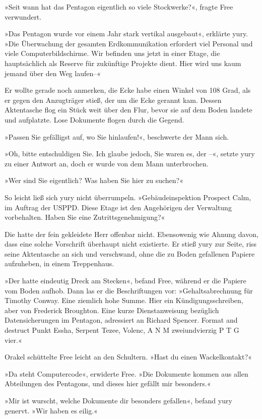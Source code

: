 »Seit wann hat das Pentagon eigentlich so viele Stockwerke?«, fragte Free verwundert.

»Das Pentagon wurde vor einem Jahr stark vertikal ausgebaut«, erklärte yury. »Die Überwachung der gesamten Erdkommunikation erfordert viel Personal und viele Computerbildschirme. Wir befinden uns jetzt in einer Etage, die hauptsächlich als Reserve für zukünftige Projekte dient. Hier wird uns kaum jemand über den Weg laufen–«

Er wollte gerade noch anmerken, die Ecke habe einen Winkel von 108 Grad, als er gegen den Anzugträger stieß, der um die Ecke gerannt kam. Dessen Aktentasche flog ein Stück weit über den Flur, bevor sie auf dem Boden landete und aufplatzte. Lose Dokumente flogen durch die Gegend.

»Passen Sie gefälligst auf, wo Sie hinlaufen!«, beschwerte der Mann sich.

»Oh, bitte entschuldigen Sie. Ich glaube jedoch, Sie waren es, der –«, setzte yury zu einer Antwort an, doch er wurde von dem Mann unterbrochen.

»Wer sind Sie eigentlich? Was haben Sie hier zu suchen?«

So leicht ließ sich yury nicht überrumpeln. »Gebäudeinspektion Prospect Calm, im Auftrag der USPPD. Diese Etage ist den Angehörigen der Verwaltung vorbehalten. Haben Sie eine Zutrittsgenehmigung?«

Die hatte der fein gekleidete Herr offenbar nicht. Ebensowenig wie Ahnung davon, dass eine solche Vorschrift überhaupt nicht existierte. Er stieß yury zur Seite, riss seine Aktentasche an sich und verschwand, ohne die zu Boden gefallenen Papiere aufzuheben, in einem Treppenhaus.

»Der hatte eindeutig Dreck am Stecken«, befand Free, während er die Papiere vom Boden aufhob. Dann las er die Beschriftungen vor: »Gehaltsabrechnung für Timothy Conway. Eine ziemlich hohe Summe. Hier ein Kündigungsschreiben, aber von Frederick Broughton. Eine kurze Dienstanweisung bezüglich Datensicherungen im Pentagon, adressiert an Richard Spencer. Format and destruct Punkt Essha, Serpent Tezee, Volenc, A N M zweiundvierzig P T G vier.«

Orakel schüttelte Free leicht an den Schultern. »Hast du einen Wackelkontakt?«

»Da steht Computercode«, erwiderte Free. »Die Dokumente kommen aus allen Abteilungen des Pentagons, und dieses hier gefällt mir besonders.«

»Mir ist wurscht, welche Dokumente dir besonders gefallen«, befand yury genervt. »Wir haben es eilig.«

